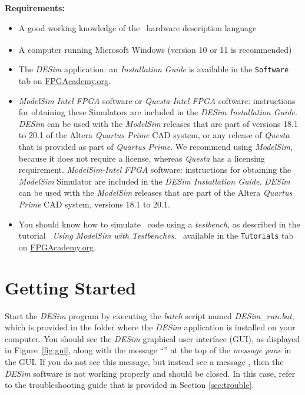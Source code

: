 {\bf Requirements:}
\vspace{-1em}
\begin{itemize}
	\item A good working knowledge of the \hdlName~hardware description 
    language\ifnotSV{}\fi
\item A computer running Microsoft\textsuperscript{\textregistered}
Windows\textsuperscript{\textregistered} (version 10 or 11 is
recommended)\fi
\item The {\it DESim} application: an {\it Installation Guide} 
is available in the \texttt{Software} tab on 
\href{https://www.fpgacademy.org/tools.html}{FPGAcademy.org}.
\item 
\ifquesta
{{\it ModelSim-Intel FPGA} software or {\it Questa-Intel FPGA} software: instructions for 
obtaining these Simulators are included in the {\it DESim Installation Guide}. {\it DESim} can 
be used with the {\it ModelSim} releases that are part of versions 18.1 to 20.1 of the 
Altera {\it Quartus Prime} CAD system, or any release of {\it Questa} that is provided as
part of {\it Quartus Prime}.} We recommend using {\it ModelSim}, because it does not require a
license, whereas {\it Questa} has a licensing requirement.
\else
{{\it ModelSim-Intel FPGA} software: instructions for obtaining the {\it ModelSim}
Simulator are included in the {\it DESim Installation Guide}. {\it DESim} can be used with 
the {\it ModelSim} releases that are part of the Altera {\it Quartus Prime} CAD system, 
versions 18.1 to 20.1.}
\fi
\item You should know how to simulate \hdlName~code using a {\it testbench}, as described
in the tutorial\fi
{\it~Using ModelSim with Testbenches}\fi. \fi~available in 
the \texttt{Tutorials} tab on
\href{https://www.fpgacademy.org/tutorials.html}{FPGAcademy.org}.
\end{itemize}

\newpage

\section{Getting Started}
\label{sec:getting_started}
Start the {\it DESim} program by executing the {\it batch} script named {\it DESim\_run.bat},
which is provided in the folder where the {\it DESim} application is installed on your computer. 
You should see the {\it DESim} graphical user interface (GUI), as displayed in 
Figure~\ref{fig:gui}, along with the message ``'' at 
the top of the {\it message pane} in the GUI. If you do not see this message, but instead 
see a message , then the {\it DESim} software is not working
properly and should be closed. In this case, refer to the troubleshooting guide that is
provided in Section \ref{sec:trouble}.

